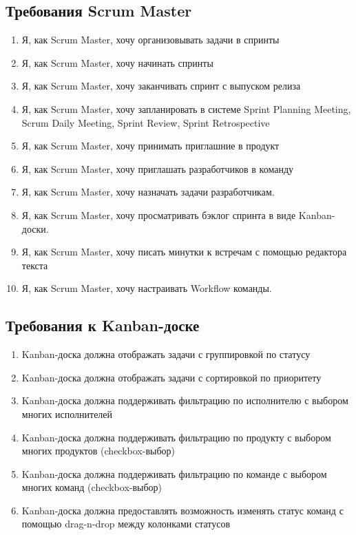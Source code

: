 \subsection{Требования Scrum Master}
\begin{enumerate}[label=\textbf{SMR\arabic*}.]
  \item Я, как Scrum Master, хочу организовывать задачи в спринты
  \item Я, как Scrum Master, хочу начинать спринты
  \item Я, как Scrum Master, хочу заканчивать спринт с выпуском релиза
  \item Я, как Scrum Master, хочу запланировать в системе
        Sprint Planning Meeting, Scrum Daily Meeting, Sprint Review, Sprint Retrospective
  \item Я, как Scrum Master, хочу принимать приглашние в продукт
  \item Я, как Scrum Master, хочу приглашать разработчиков в команду
  \item Я, как Scrum Master, хочу назначать задачи разработчикам.
  \item Я, как Scrum Master, хочу просматривать бэклог спринта в виде Kanban-доски.
  \item Я, как Scrum Master, хочу писать минутки к встречам с помощью редактора текста
  \item Я, как Scrum Master, хочу настраивать Workflow команды.
\end{enumerate}

\subsection{Требования к Kanban-доске}
\begin{enumerate}[label=\textbf{KBR\arabic*}.]
  \item Kanban-доска должна отображать задачи с группировкой по статусу
  \item Kanban-доска должна отображать задачи с сортировкой по приоритету
  \item Kanban-доска должна поддерживать фильтрацию по исполнителю с выбором
        многих исполнителей
  \item Kanban-доска должна поддерживать фильтрацию по продукту с выбором
        многих продуктов (checkbox-выбор)
  \item Kanban-доска должна поддерживать фильтрацию по команде с выбором
        многих команд (checkbox-выбор)
  \item Kanban-доска должна предоставлять возможность изменять статус
        команд с помощью drag-n-drop между колонками статусов
\end{enumerate}

